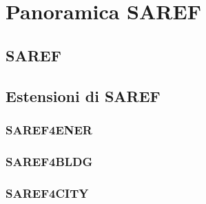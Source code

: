 \chapter{Panoramica SAREF}
\section{SAREF}

\section{Estensioni di SAREF}

\subsection{SAREF4ENER}

\subsection{SAREF4BLDG}

\subsection{SAREF4CITY}
